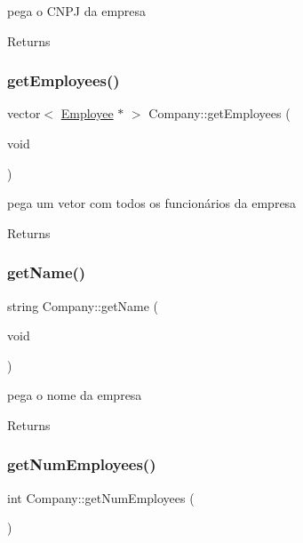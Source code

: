 pega o C\+N\+PJ da empresa 

\begin{DoxyReturn}{Returns}

\end{DoxyReturn}
\mbox{\label{classCompany_a16c355b15a77982b09d19e33e3f39914}} 
\subsubsection{\texorpdfstring{get\+Employees()}{getEmployees()}}
{\footnotesize\ttfamily vector$<$ \hyperlink{classEmployee}{Employee} $\ast$ $>$ Company\+::get\+Employees (\begin{DoxyParamCaption}\item[{void}]{ }\end{DoxyParamCaption})}



pega um vetor com todos os funcionários da empresa 

\begin{DoxyReturn}{Returns}

\end{DoxyReturn}
\mbox{\label{classCompany_a8f1ee72530d6071134dbe1191c6aa890}} 
\subsubsection{\texorpdfstring{get\+Name()}{getName()}}
{\footnotesize\ttfamily string Company\+::get\+Name (\begin{DoxyParamCaption}\item[{void}]{ }\end{DoxyParamCaption})}



pega o nome da empresa 

\begin{DoxyReturn}{Returns}

\end{DoxyReturn}
\mbox{\label{classCompany_a8f8e8e00fbd5c1da80a39adab3f1bd38}} 
\subsubsection{\texorpdfstring{get\+Num\+Employees()}{getNumEmployees()}}
{\footnotesize\ttfamily int Company\+::get\+Num\+Employees (\begin{DoxyParamCaption}{ }\end{DoxyParamCaption})}



